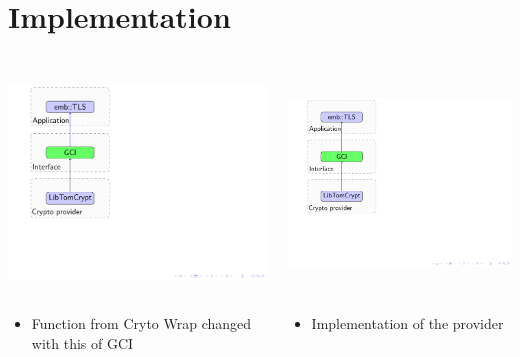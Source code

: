 \section{Implementation}

\begin{frame}

\begin{columns}

\begin{column}{0.5\textwidth}

\includegraphics[trim=0.5cm 3cm 14cm 0cm, height=6cm]{figures/int_app_gci.pdf}

\begin{itemize}
  \item \small{Function from Cryto Wrap changed with this of GCI}
\end{itemize}

\end{column}

\begin{column}{0.5\textwidth}

\includegraphics[trim=0.5cm 3cm 14cm 0cm,
height=6cm]{figures/int_app_prov_gci.pdf}

\begin{itemize}
  \item \small{Implementation of the provider \tomcrypt}
\end{itemize}

\end{column}

\end{columns}

\end{frame}

